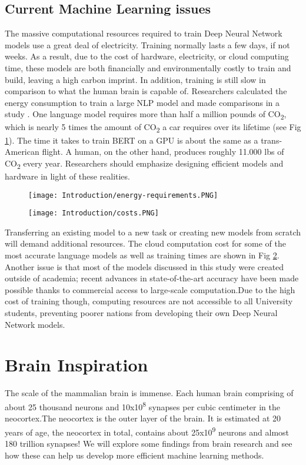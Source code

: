 \documentclass[12pt]{report}
\begin{document}
\section{Current Machine Learning issues}
The massive computational resources required to train Deep Neural Network models use a great deal of electricity. Training normally lasts a few days, if not weeks. As a result, due to the cost of hardware, electricity, or cloud computing time, these models are both financially and environmentally costly to train and build, leaving a high carbon imprint. In addition, training is still slow in comparison to what the human brain is capable of. Researchers calculated the energy consumption to train a large NLP model and made comparisons in a study \cite{Strubell2019}. One language model requires more than half a million pounds of CO\textsubscript{2}, which is nearly 5 times the amount of CO\textsubscript{2} a car requires over its lifetime (see Fig \ref{fig:energy-requirements}). The time it takes to train BERT on a GPU is about the same as a trans-American flight. A human, on the other hand, produces roughly 11.000 lbs of CO\textsubscript{2} every year. Researchers should emphasize designing efficient models and hardware in light of these realities.

\begin{figure}[htp]
    \centering
    \texttt{[image: Introduction/energy-requirements.PNG]}
    \caption{}
    \label{fig:energy-requirements}
\end{figure}
\begin{figure}[htp]
    \centering
    \texttt{[image: Introduction/costs.PNG]}
    \caption{}
    \label{fig:costs}
\end{figure}

Transferring an existing model to a new task or creating new models from scratch will demand additional resources. The cloud computation cost for some of the most accurate language models as well as training times are shown in Fig \ref{fig:costs}. Another issue is that most of the models discussed in this study \cite{Strubell2019} were created outside of academia; recent advances in state-of-the-art accuracy have been made possible thanks to commercial access to large-scale computation.Due to the high cost of training though, computing resources are not accessible to all University students, preventing poorer nations from developing their own Deep Neural Network models.

\chapter{Brain Inspiration}
The scale of the mammalian brain is immense. Each human brain comprising of about 25 thousand neurons and  10x10\textsuperscript{8} synapses per cubic centimeter \cite{nguyen2013} in the neocortex.The neocortex is the outer layer of the brain. It is estimated at 20 years of age, the neocortex in total, contains about 25x10\textsuperscript{9} neurons and almost 180 trillion synapses! We will explore some findings from brain research and see how these can help us develop more efficient machine learning methods.
\end{document}
